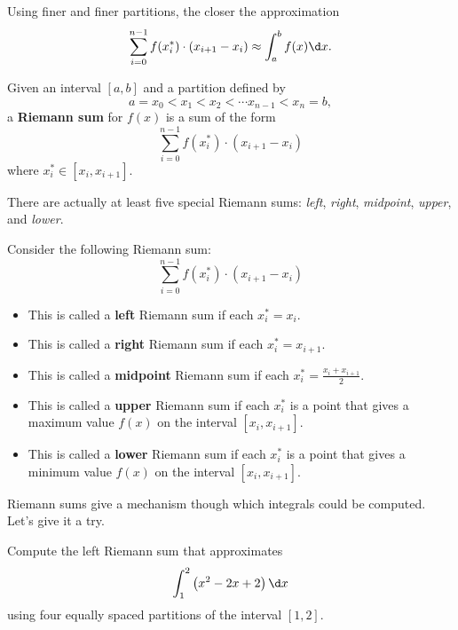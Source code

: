 \begin{marginfigure}
\caption{Using finer and finer partitions, the closer the approximation
\[
\sum_{i=0}^{n-1} f(x_i^*) \cdot (x_{i+1}-x_i) \approx \int_a^b f(x) \d x.
\]}
\label{figure:partitionsfiner}
\end{marginfigure}


\begin{definition}
Given an interval $[a,b]$ and a partition defined by
\[
a = x_0 < x_1 <x_2 < \cdots x_{n-1}< x_n = b,
\]
a \textbf{Riemann sum} for $f(x)$ is a sum of the form
\[
\sum_{i=0}^{n-1} f(x_i^*) \cdot (x_{i+1}-x_i)
\]
where $x_i^*\in [x_i,x_{i+1}]$.
\end{definition}

There are actually at least five special Riemann sums: \textit{left},
\textit{right}, \textit{midpoint}, \textit{upper}, and \textit{lower}.

\begin{definition}
Consider the following Riemann sum:
\[
\sum_{i=0}^{n-1} f(x_i^*) \cdot (x_{i+1}-x_i)
\]
\begin{itemize}
\item This is called a \textbf{left} Riemann sum if each $x_i^* =
  x_i$.
\item This is called a \textbf{right} Riemann sum if each $x_i^* =
  x_{i+1}$.
\item This is called a \textbf{midpoint} Riemann sum if each $x_i^*
  = \frac{x_i+x_{i+1}}{2}$.
\item This is called a \textbf{upper} Riemann sum if each $x_i^*$ is
  a point that gives a maximum value $f(x)$ on the interval
  $[x_i,x_{i+1}]$.
\item This is called a \textbf{lower} Riemann sum if each $x_i^*$ is a
  point that gives a minimum value $f(x)$ on the interval
  $[x_i,x_{i+1}]$.
\end{itemize}
\end{definition}
Riemann sums give a mechanism though which integrals could be
computed. Let's give it a try.

\begin{example}
Compute the left Riemann sum that approximates
\[
\int_1^2 \left(x^2-2x+2\right)\d x
\]
using four equally spaced partitions of the interval $[1,2]$.
\end{example}

